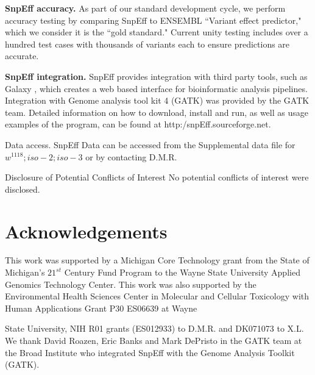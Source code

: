 
\textbf{SnpEff accuracy.} As part of our standard development cycle, we perform accuracy testing by comparing SnpEff to ENSEMBL ``Variant effect predictor," which we consider it is the ``gold standard." Current unity testing includes over a hundred test cases with thousands of variants each to ensure predictions are accurate.

\textbf{SnpEff integration.} SnpEff provides integration with third party tools, such as Galaxy \cite{giardine2005galaxy}, which creates a web based interface for bioinformatic analysis pipelines.  Integration with Genome analysis tool kit 4 (GATK) was provided by the GATK team.  Detailed information on how to download, install and run, as well as usage examples of the program, can be found at http:/snpEff.sourceforge.net.  

Data access. SnpEff Data can be accessed from the Supplemental data file for $w^{1118} ; iso-2; iso-3$ or by contacting D.M.R.

Disclosure of Potential Conflicts of Interest No potential conflicts of interest were disclosed.

\section{Acknowledgements}

This work was supported by a Michigan Core Technology grant from the State of Michigan’s $21^{st}$ Century Fund Program to the Wayne State University Applied Genomics Technology Center. This work was also supported by the Environmental Health Sciences Center in Molecular and Cellular Toxicology with Human Applications Grant P30 ES06639 at Wayne

State University, NIH R01 grants (ES012933) to D.M.R. and DK071073 to X.L. We thank David Roazen, Eric Banks and Mark DePristo in the GATK team at the Broad Institute who integrated SnpEff with the Genome Analysis Toolkit (GATK).

